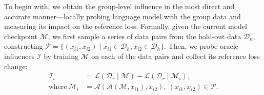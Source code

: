 


To begin with, we obtain the group-level influence in the most direct and accurate manner—locally probing language model with the group data and measuring its impact on the reference loss. Formally, given the current model checkpoint $\mathcal{M}$, we first sample a series of data pairs from the hold-out data $\mathcal{D}_h$, constructing $\mathcal{P} = \{(x_{i1}, x_{i2}) \mid x_{i1} \in \mathcal{D}_h, x_{i2} \in \mathcal{D}_h\}$. Then, we probe oracle influences $\mathcal{I}$ by training $\mathcal{M}$ on each of the data pairs and collect its reference loss change:
\begin{align}
    \mathcal{I}_i &= \mathcal{L}(\mathcal{D}_r \mid \mathcal{M}) - \mathcal{L}(\mathcal{D}_r \mid \mathcal{M}_i),\\
\text{where}~\mathcal{M}_i &= \mathcal{A}(\mathcal{A}(\mathcal{M}, x_{i1}), x_{i2}),~(x_{i1}, x_{i2}) \in \mathcal{P}.
\end{align}

